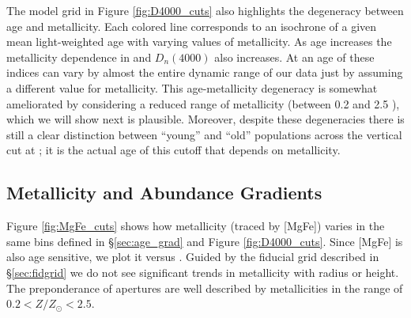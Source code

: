 

The model grid in Figure \ref{fig:D4000_cuts} also highlights the
degeneracy between age and metallicity. Each colored line corresponds
to an isochrone of a given mean light-weighted age with varying values
of metallicity. As age increases the metallicity dependence in \Hda
and $D_n(4000)$ also increases. At an age of  these
indices can vary by almost the entire dynamic range of our data just
by assuming a different value for metallicity.  This age-metallicity
degeneracy is somewhat ameliorated by considering a reduced range of
metallicity (between 0.2 and 2.5 \Zsol), which we will show next is
plausible. Moreover, despite these degeneracies there is still a clear
distinction between ``young'' and ``old'' populations across the
vertical cut at ; it is the actual age of this cutoff
that depends on metallicity.

\subsection{Metallicity and Abundance Gradients}

Figure \ref{fig:MgFe_cuts} shows how metallicity (traced by [MgFe])
varies in the same bins defined in \S\ref{sec:age_grad} and Figure
\ref{fig:D4000_cuts}. Since [MgFe] is also age sensitive, we plot it
versus \Hda.  Guided by the fiducial grid described in
\S\ref{sec:fidgrid} we do not see significant trends in metallicity
with radius or height. The preponderance of apertures are well
described by metallicities in the range of $0.2 < Z/Z_\odot < 2.5$.

